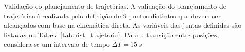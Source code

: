 \documentclass[xcolor=dvipsnames,aspectratio=169]{beamer}
\begin{document}
\begin{frame}{Validação do planejamento de trajetórias.}
    A validação do planejamento de trajetórias é realizada pela definição de 9 pontos distintos que devem ser alcançados com base na cinemática direta. As variáveis das juntas definidas são listadas na Tabela \autoref{tab:hist_trajetoria}. Para a transição entre posições, considera-se um intervalo de tempo \(\Delta T = 15\ s\)

    \begin{table}[h]
        \centering
        \caption{Histórico de variáveis das juntas na trajetória.}
        \label{tab:hist_trajetoria}
    \end{table}
\end{frame}
\end{document}
